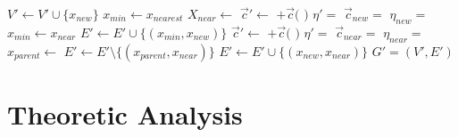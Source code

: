 \documentclass[conference]{IEEEtran}
\theoremstyle{definition}
\begin{document}
\begin{algorithm}
\begin{algorithmic}[1]
\State $ V' \leftarrow V' \cup \{ x_{new} \} $
\State $ x_{min} \leftarrow x_{nearest} $
\State $ X_{near} \leftarrow $ 
		\State $ \vec{c}' \leftarrow $  $ + \vec{c}( $  $ ) $ 
		\State $ \eta' =  $ 
		\State $ \vec{c}_{new} = $  
		\State $ \eta_{new} = $ 
			\State $ x_{min} \leftarrow x_{near} $
		\EndIf
	\EndIf
\EndFor
\State $ E' \leftarrow E' \cup \{ ( x_{min}, x_{new} ) \} $
		\State $ \vec{c}' \leftarrow $  $ + \vec{c}( $  $ ) $ 
		\State $ \eta' =  $ 
		\State $ \vec{c}_{near} = $  
		\State $ \eta_{near} = $ 
			\State $ x_{parent} \leftarrow $ 
			\State $ E' \leftarrow E' \setminus \{ ( x_{parent}, x_{near} ) \} $
			\State $ E' \leftarrow E' \cup \{ ( x_{new}, x_{near} ) \} $
		\EndIf
	\EndIf
\EndFor
\Return $ G' = (V', E') $ 
\end{algorithmic}
\label{alg:morrtstar:extend:sub}
\caption{ $ \mbox{Extend}_{Sub} (G, x) $}
\end{algorithm} 


\section{Theoretic Analysis}
\label{sec:theoretic_analysis}
\end{document}
